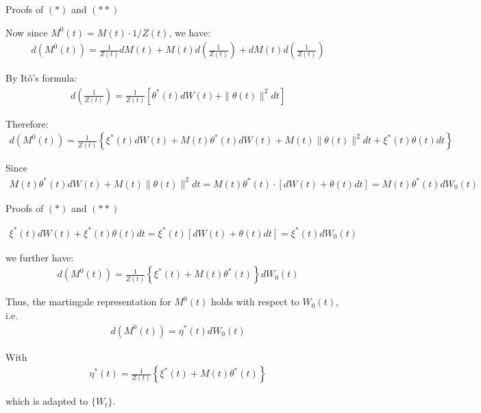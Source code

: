 \documentclass{beamer}
\begin{document}
\begin{frame}{Proofs of $(*)$ and $(**)$}

    {\footnotesize \footnotesize
   
    \par Now since \( M^0(t) = M(t) \cdot 1/Z(t) \), we have:
    \begin{align*}
        d(M^0(t)) = \frac{1}{Z(t)} dM(t) + M(t) d\left(\frac{1}{Z(t)}\right) + dM(t) d\left(\frac{1}{Z(t)}\right)
    \end{align*}
    \par By Itô's formula:
    \begin{align*}
        d \left( \frac{1}{Z(t)} \right) =  \frac{1}{Z(t)} \left[ \theta^*(t) dW(t) + \| \theta(t) \|^2 dt \right]
    \end{align*}
     \par Therefore:
    \begin{align*}
        d(M^0(t)) = \frac{1}{Z(t)} \left\{ \xi^*(t) dW(t) + M(t) \theta^*(t) dW(t) + M(t) \| \theta(t) \|^2 dt + \xi^*(t) \theta(t) dt \right\}
    \end{align*}
    \par Since
    \begin{align*}
        M(t) \theta^*(t) dW(t) + M(t) \| \theta(t) \|^2 dt = M(t) \theta^*(t) \cdot [dW(t) + \theta(t) dt] = M(t) \theta^*(t) dW_0(t)
    \end{align*}
    }

\end{frame}

\begin{frame}{Proofs of $(*)$ and $(**)$}

    {\footnotesize \footnotesize
   \begin{align*}
    \xi^*(t)dW(t) + \xi^*(t)\theta(t)dt = \xi^*(t)[dW(t) + \theta(t)dt] = \xi^*(t)dW_0(t)
   \end{align*}
   \par we further have:
   \begin{align*}
    d(M^0(t)) = \frac{1}{Z(t)} \left\{ \xi^*(t) + M(t)\theta^*(t) \right\} dW_0(t)
   \end{align*}
   \par Thus, the martingale representation for \(M^0(t)\) holds with respect to \(W_0(t)\), i.e.
   \begin{align*}
    d(M^0(t)) = \eta^*(t)dW_0(t)
   \end{align*}
   \par With 
   \begin{align*}
    \eta^*(t) = \frac{1}{Z(t)} \left\{ \xi^*(t) + M(t)\theta^*(t) \right\}
   \end{align*}
   \par which is adapted to \(\{W_t\}\).
    }

\end{frame}
\end{document}
